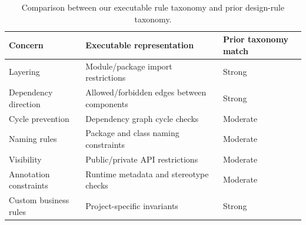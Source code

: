 \begin{table}[t]
\centering
\caption{Comparison between our executable rule taxonomy and prior design-rule taxonomy.}
\label{tab:taxonomy_comparison}
\setlength{\aboverulesep}{0pt}
\setlength{\belowrulesep}{0pt}
\renewcommand{\arraystretch}{1.25}
\begin{tabular}{p{3cm}p{3.6cm}p{2.6cm}}
\toprule
\textbf{Concern} & \textbf{Executable representation} & \textbf{Prior taxonomy match} \\
\midrule
\rowcolor{rowband}
Layering & Module/package import restrictions & Strong \\
Dependency direction & Allowed/forbidden edges between components & Strong \\
\rowcolor{rowband}
Cycle prevention & Dependency graph cycle checks & Moderate \\
Naming rules & Package and class naming constraints & Moderate \\
\rowcolor{rowband}
Visibility & Public/private API restrictions & Moderate \\
Annotation constraints & Runtime metadata and stereotype checks & Moderate \\
\rowcolor{rowband}
Custom business rules & Project-specific invariants & Strong \\
\bottomrule
\end{tabular}
\end{table}
